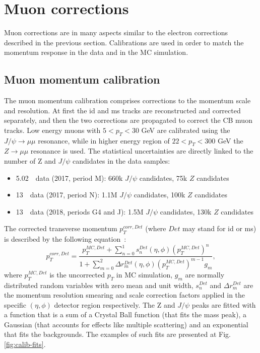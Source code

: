     \section{Muon corrections}
	Muon corrections are in many aspects similar to the electron corrections described in the previous section. Calibrations are used in order to match the momentum response in the data and in the MC simulation.
    \subsection{Muon momentum calibration}
	The muon momentum calibration comprises corrections to the momentum scale and resolution. At first the \gls{id} and \gls{ms} tracks are reconstructed and corrected separately, and then the two corrections are propagated to correct the CB muon tracks. Low energy muons with $5<p_T<30$ GeV are calibrated using the $J/\psi\rightarrow\mu\mu$ resonance, while in higher energy region of $22<p_T<300$ GeV the $Z \rightarrow\mu\mu$ resonance is used. The statistical uncertainties are directly linked to the number of Z and $J/\psi$ candidates in the data samples:
	\begin{itemize}
			\item{5.02~\TeV\ data (2017, period M): 660k $J/\psi$ candidates, 75k $Z$ candidates}
			\item{13~\TeV\ data (2017, period N): 1.1M $J/\psi$ candidates, 100k $Z$ candidates}
			\item{13~\TeV\ data (2018, periods G4 and J): 1.5M $J/\psi$ candidates, 130k $Z$ candidates}
	\end{itemize}
The corrected transverse momentum $p_T^{corr,Det}$ (where $Det$ may stand for \gls{id} or \gls{ms}) is described by the following equation~\cite{muons_reco1}:
\begin{equation}
	p_T^{corr,Det}=\frac{p_T^{MC,Det}+\sum_{n=0}^1s_n^{Det}(\eta,\phi)\left(p_T^{MC,Det}\right)^n}{1+\sum_{m=0}^2\Delta r_m^{Det}(\eta,\phi)\left(p_T^{MC,Det}\right)^{m-1}g_m},
\end{equation}
where $p_T^{MC,Det}$ is the uncorrected $p_T$ in MC simulation, $g_m$ are normally distributed random variables with zero mean and unit width, $s_n^{Det}$ and $\Delta r_m^{Det}$ are the momentum resolution smearing and scale correction factors applied in the specific $(\eta,\phi)$ detector region respectively. 
	The Z and $J/\psi$ peaks are fitted with a function that is a sum of a Crystal Ball function (that fits the mass peak), a Gaussian (that accounts for effects like multiple scattering) and an exponential that fits the backgrounds. The examples of such fits are presented at Fig. \ref{fig:calib-fits}.\\
